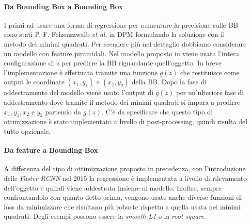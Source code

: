 \paragraph{Da Bounding Box a Bounding Box}
I primi ad usare una forma di regressione per aumentare la precisione sulle \ac{BB} sono stati P. F. Felzenszwalb \textit{et al.} in DPM \cite{5255236} formulando la soluzione con il metodo dei minimi quadrati. Per scendere più nel dettaglio dobbiamo considerare un modello con feature piramidali.
Nel modello proposto in \cite{5255236} viene usata l'intera configurazione di $z$ per predirre la \ac{BB} riguardante quell'oggetto. In breve l'implementazione è effettuata tramite una funzione $g(z)$ che restituisce come output le coordinate $(x_1, y_1)$ e $(x_2, y_2)$ della \ac{BB}. Dopo la fase di addestramento del modello viene usato l'output di $g(z)$ per un'ulteriore fase di addestramento dove tramite il metodo dei minimi quadrati si impara a predirre $x_1, y_1, x_2 \text{ e } y_2$ partendo da $g(z)$. C'è da specificare che questo tipo di ottimizzazione è stato implementato a livello di post-processing, quindi risulta del tutto opzionale.
\paragraph{Da feature a Bounding Box}
A differenza del tipo di ottimizzazione proposto in precedenza, con l'introduzione delle \textit{Faster RCNN} \cite{ren2015faster} nel $2015$ la regressione è implementata a livello di rilevamento dell'oggetto e quindi viene addestrata insieme al modello. Inoltre, sempre confrontandolo con quanto detto prima, vengono usate anche diverse funzioni di loss da minimizzare che risultano più robuste rispetto a quella usata nei minimi quadrati. Degli esempi possono essere la \textit{smooth-L1} o la \textit{root-square}.

